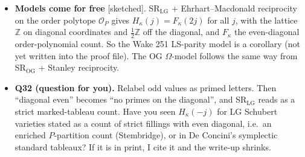 \documentclass[10pt]{amsart}
\newcommand{\grade}[1]{\textsf{[#1]}}
\newcommand{\LG}{\mathrm{LG}}
\newcommand{\OG}{\mathrm{OG}}
\theoremstyle{remark}
\begin{document}
\begin{itemize}
\item \textbf{Models come for free} \grade{sketched}. SR$_{\LG}$ + Ehrhart--Macdonald reciprocity on the order polytope
$\mathcal O_P$ gives $H_\kappa(j)=F_\kappa(2j)$ for all $j$, with the lattice $\mathbb Z$ on diagonal coordinates and
$\tfrac12\mathbb Z$ off the diagonal, and $F_\kappa$ the even-diagonal order-polynomial count. So the Wake 251 LS-parity
model is a corollary (not yet written into the proof file). The OG $\Omega$-model follows the same way from SR$_{\OG}$ +
Stanley reciprocity.
\item \textbf{Q32 (question for you).} Relabel odd values as primed letters. Then ``diagonal even'' becomes ``no primes on
the diagonal'', and SR$_{\LG}$ reads as a strict marked-tableau count. Have you seen $H_\kappa(-j)$ for LG Schubert
varieties stated as a count of strict fillings with even diagonal, i.e.\ an enriched $P$-partition count (Stembridge), or
in De Concini's symplectic standard tableaux? If it is in print, I cite it and the write-up shrinks.
\end{itemize}
\end{document}
